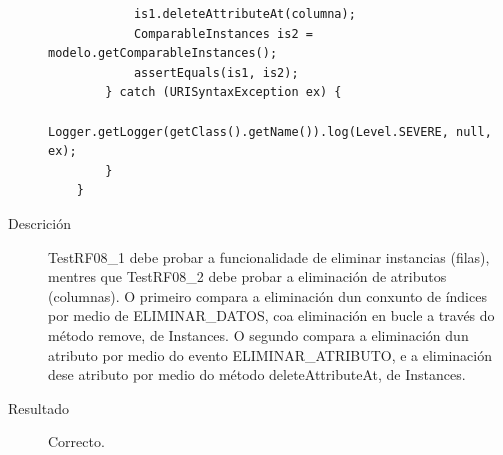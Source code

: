 \begin{description}
\begin{lstlisting}
            is1.deleteAttributeAt(columna);
            ComparableInstances is2 = modelo.getComparableInstances();
            assertEquals(is1, is2);
        } catch (URISyntaxException ex) {
            Logger.getLogger(getClass().getName()).log(Level.SEVERE, null, ex);
        }
    }
\end{lstlisting}
\item[Descrición]
TestRF08\_1 debe probar a funcionalidade de eliminar instancias (filas), mentres que TestRF08\_2 debe probar a eliminación de atributos (columnas). O primeiro compara a eliminación dun conxunto de índices por medio de ELIMINAR\_DATOS, coa eliminación en bucle a través do método remove, de Instances. O segundo compara a eliminación dun atributo por medio do evento ELIMINAR_ATRIBUTO, e a eliminación dese atributo por medio do método deleteAttributeAt, de Instances.
\item[Resultado]
Correcto.
\end{description}

